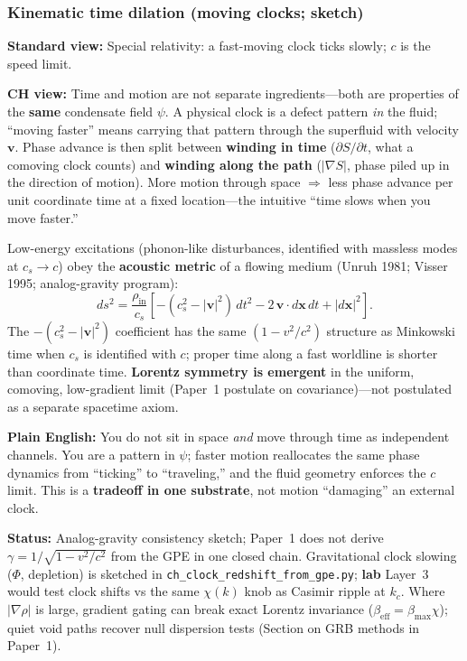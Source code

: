 \documentclass[11pt,a4paper]{article}
\begin{document}
\subsubsection{Kinematic time dilation (moving clocks; sketch)}

\textbf{Standard view:} Special relativity: a fast-moving clock ticks slowly; $c$ is the speed limit.

\textbf{CH view:} Time and motion are not separate ingredients---both are properties of the \textbf{same} condensate field $\psi$.
A physical clock is a defect pattern \emph{in} the fluid; ``moving faster'' means carrying that pattern through the superfluid with velocity $\mathbf{v}$.
Phase advance is then split between \textbf{winding in time} ($\partial S/\partial t$, what a comoving clock counts) and \textbf{winding along the path} ($|\nabla S|$, phase piled up in the direction of motion).
More motion through space $\Rightarrow$ less phase advance per unit coordinate time at a fixed location---the intuitive ``time slows when you move faster.''

Low-energy excitations (phonon-like disturbances, identified with massless modes at $c_s \to c$) obey the \textbf{acoustic metric} of a flowing medium (Unruh 1981; Visser 1995; analog-gravity program):
\begin{equation}
  ds^2 = \frac{\rho_{\mathrm{in}}}{c_s}\left[
    -(c_s^2 - |\mathbf{v}|^2)\,dt^2 - 2\,\mathbf{v}\cdot d\mathbf{x}\,dt + |d\mathbf{x}|^2
  \right].
\end{equation}
The $-(c_s^2 - |\mathbf{v}|^2)$ coefficient has the same $(1 - v^2/c^2)$ structure as Minkowski time when $c_s$ is identified with $c$; proper time along a fast worldline is shorter than coordinate time.
\textbf{Lorentz symmetry is emergent} in the uniform, comoving, low-gradient limit (Paper~1 postulate on covariance)---not postulated as a separate spacetime axiom.

\textbf{Plain English:} You do not sit in space \emph{and} move through time as independent channels.
You are a pattern in $\psi$; faster motion reallocates the same phase dynamics from ``ticking'' to ``traveling,'' and the fluid geometry enforces the $c$ limit.
This is a \textbf{tradeoff in one substrate}, not motion ``damaging'' an external clock.

\textbf{Status:} Analog-gravity consistency sketch; Paper~1 does not derive $\gamma = 1/\sqrt{1-v^2/c^2}$ from the GPE in one closed chain.
Gravitational clock slowing ($\Phi$, depletion) is sketched in \texttt{ch\_clock\_redshift\_from\_gpe.py}; \textbf{lab} Layer~3 would test clock shifts vs the same $\chi(k)$ knob as Casimir ripple at $k_c$.
Where $|\nabla\rho|$ is large, gradient gating can break exact Lorentz invariance ($\beta_{\mathrm{eff}} = \beta_{\max}\chi$); quiet void paths recover null dispersion tests (Section on GRB methods in Paper~1).
\end{document}
